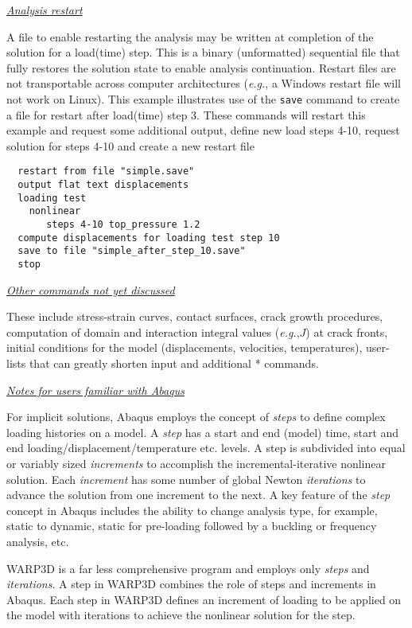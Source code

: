 \documentclass[11pt]{report}
\numberwithin{equation}{section}
\newcommand{\ttt} {\texttt}  %
\newcommand{\ul} {\underline}
\newcommand{\eg}{\emph{e.g.},\xspace}
\newcommand{\ti}{\emph}
\newcommand{\nid}{\noindent}
\begin{document}
{\nid \ti{\ul{Analysis restart} }

\nid A file to enable restarting  the analysis may be written at completion of the
solution for a load(time) step. This is a binary (unformatted) sequential file that fully restores
the solution state to enable analysis continuation. Restart files are not transportable across computer
architectures (\eg a Windows restart file will not work on Linux).  This example illustrates use
of the \ttt{save} command to create a file for restart after load(time) step 3. These commands 
will restart this example and request some additional output, define new load steps 4-10,
request solution for steps 4-10 and create a new restart file

\small\begin{verbatim}
  restart from file "simple.save"
  output flat text displacements
  loading test 
    nonlinear
       steps 4-10 top_pressure 1.2
  compute displacements for loading test step 10
  save to file "simple_after_step_10.save"
  stop
\end{verbatim}  \normalsize


\nid \ti{\ul{Other commands not yet discussed} }

\nid These include stress-strain curves, contact surfaces, crack growth procedures, 
computation of domain and interaction integral values (\eg $J$)
at crack fronts, initial conditions for the model (displacements, velocities, temperatures), user-lists that
can greatly shorten input and additional * commands. 

\nid \ti{\ul{Notes for users familiar with Abaqus} }

\nid For implicit solutions, Abaqus employs the concept of \ti{steps} to define 
complex loading histories on
a model. A \ti{step} has a start and end (model) time, start and end 
loading/displacement/temperature etc.
levels.  A step is subdivided
into equal or variably sized \ti{increments} to accomplish the 
incremental-iterative nonlinear solution.
Each \ti{increment} has some number of global Newton \ti{iterations} to 
advance the solution from one increment to
the next. A key feature of the \ti{step} concept in Abaqus includes the 
ability to change analysis type, for example, static to
dynamic, static for pre-loading followed by a buckling or frequency 
analysis, etc.

WARP3D is a far less comprehensive program and employs only \ti{steps} 
and \ti{iterations}. A step in WARP3D combines
the role of steps and increments in Abaqus. Each step in WARP3D defines an increment 
of loading to be applied on the model with iterations to achieve the nonlinear solution for the step.

}
\end{document}
